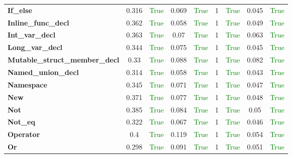 \documentclass{article}
\begin{document}
\begin{xltabular}{\textwidth}{lcccccccc}
\textbf{{\fontsize{10}{12}\selectfont If\_else}}& 0.316&\textcolor{green}{True}& 0.069&\textcolor{green}{True}& 1&\textcolor{green}{True}& 0.045&\textcolor{green}{True} \\[0.5ex]
\textbf{{\fontsize{10}{12}\selectfont Inline\_func\_decl}}& 0.362&\textcolor{green}{True}& 0.058&\textcolor{green}{True}& 1&\textcolor{green}{True}& 0.049&\textcolor{green}{True} \\[0.5ex]
\textbf{{\fontsize{10}{12}\selectfont Int\_var\_decl}}& 0.363&\textcolor{green}{True}& 0.07&\textcolor{green}{True}& 1&\textcolor{green}{True}& 0.063&\textcolor{green}{True} \\[0.5ex]
\textbf{{\fontsize{10}{12}\selectfont Long\_var\_decl}}& 0.344&\textcolor{green}{True}& 0.075&\textcolor{green}{True}& 1&\textcolor{green}{True}& 0.045&\textcolor{green}{True} \\[0.5ex]
\textbf{{\fontsize{10}{12}\selectfont Mutable\_struct\_member\_decl}}& 0.33&\textcolor{green}{True}& 0.088&\textcolor{green}{True}& 1&\textcolor{green}{True}& 0.082&\textcolor{green}{True} \\[0.5ex]
\textbf{{\fontsize{10}{12}\selectfont Named\_union\_decl}}& 0.314&\textcolor{green}{True}& 0.058&\textcolor{green}{True}& 1&\textcolor{green}{True}& 0.043&\textcolor{green}{True} \\[0.5ex]
\textbf{{\fontsize{10}{12}\selectfont Namespace}}& 0.345&\textcolor{green}{True}& 0.071&\textcolor{green}{True}& 1&\textcolor{green}{True}& 0.047&\textcolor{green}{True} \\[0.5ex]
\textbf{{\fontsize{10}{12}\selectfont New}}& 0.371&\textcolor{green}{True}& 0.077&\textcolor{green}{True}& 1&\textcolor{green}{True}& 0.048&\textcolor{green}{True} \\[0.5ex]
\textbf{{\fontsize{10}{12}\selectfont Not}}& 0.385&\textcolor{green}{True}& 0.084&\textcolor{green}{True}& 1&\textcolor{green}{True}& 0.05&\textcolor{green}{True} \\[0.5ex]
\textbf{{\fontsize{10}{12}\selectfont Not\_eq}}& 0.322&\textcolor{green}{True}& 0.067&\textcolor{green}{True}& 1&\textcolor{green}{True}& 0.046&\textcolor{green}{True} \\[0.5ex]
\textbf{{\fontsize{10}{12}\selectfont Operator}}& 0.4&\textcolor{green}{True}& 0.119&\textcolor{green}{True}& 1&\textcolor{green}{True}& 0.054&\textcolor{green}{True} \\[0.5ex]
\textbf{{\fontsize{10}{12}\selectfont Or}}& 0.298&\textcolor{green}{True}& 0.091&\textcolor{green}{True}& 1&\textcolor{green}{True}& 0.051&\textcolor{green}{True} \\[0.5ex]

\end{xltabular}
\end{document}
